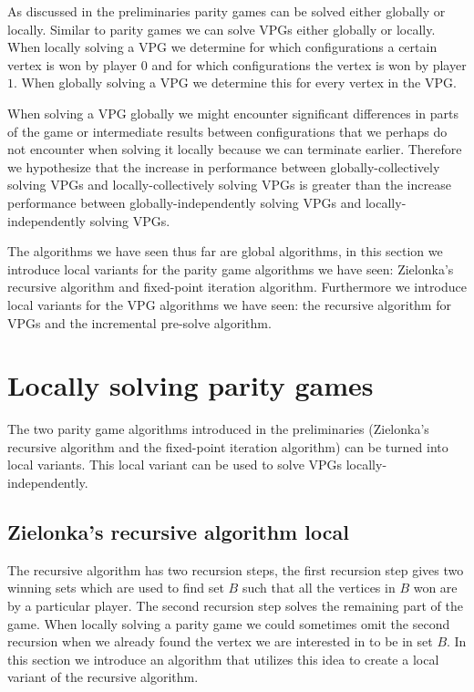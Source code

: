 As discussed in the preliminaries parity games can be solved either globally or locally. Similar to parity games we can solve VPGs either globally or locally. When locally solving a VPG we determine for which configurations a certain vertex is won by player $0$ and for which configurations the vertex is won by player $1$. When globally solving a VPG we determine this for every vertex in the VPG.

When solving a VPG globally we might encounter significant differences in parts of the game or intermediate results between configurations that we perhaps do not encounter when solving it locally because we can terminate earlier. Therefore we hypothesize that the increase in performance between globally-collectively solving VPGs and locally-collectively solving VPGs is greater than the increase performance between globally-independently solving VPGs and locally-independently solving VPGs.

The algorithms we have seen thus far are global algorithms, in this section we introduce local variants for the parity game algorithms we have seen: Zielonka's recursive algorithm and fixed-point iteration algorithm. Furthermore we introduce local variants for the VPG algorithms we have seen: the recursive algorithm for VPGs and the incremental pre-solve algorithm.

\section{Locally solving parity games}
The two parity game algorithms introduced in the preliminaries (Zielonka's recursive algorithm and the fixed-point iteration algorithm) can be turned into local variants. This local variant can be used to solve VPGs locally-independently.

\subsection{Zielonka's recursive algorithm local}
\label{sec:zlnk_org_local}
The recursive algorithm has two recursion steps, the first recursion step gives two winning sets which are used to find set $B$ such that all the vertices in $B$ won are by a particular player. The second recursion step solves the remaining part of the game. When locally solving a parity game we could sometimes omit the second recursion when we already found the vertex we are interested in to be in set $B$. In this section we introduce an algorithm that utilizes this idea to create a local variant of the recursive algorithm.

